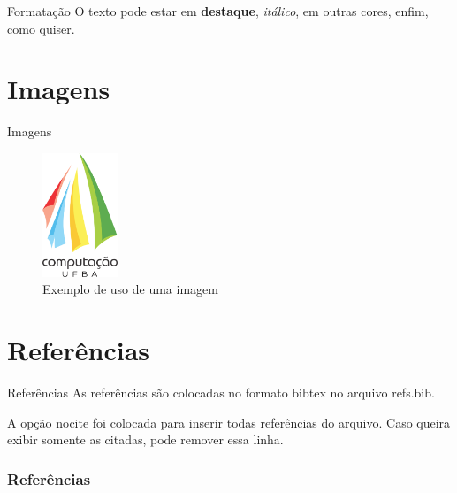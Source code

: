 \documentclass[aspectratio=169,xcolor=table]{beamer}
\begin{document}
\begin{frame}{Formatação}
    O texto pode estar em \textbf{destaque}, \textit{itálico}, em outras 
    {\color{red}cores}, enfim, como quiser.
\end{frame}

\section{Imagens}

\begin{frame}{Imagens}
    \begin{figure}
        \centering
        \includegraphics[width=0.2\textwidth]{dcc.png}
        \caption{Exemplo de uso de uma imagem}
    \end{figure}
\end{frame}

\section{Referências}
\nocite{*}

\begin{frame}{Referências}
    As referências são colocadas no formato bibtex no arquivo refs.bib.

    A opção nocite foi colocada para inserir todas referências do arquivo. Caso
    queira exibir somente as citadas, pode remover essa linha.
\end{frame}

\begin{frame}[allowframebreaks]
        \frametitle{Referências}
        
        
\end{frame}
\end{document}
